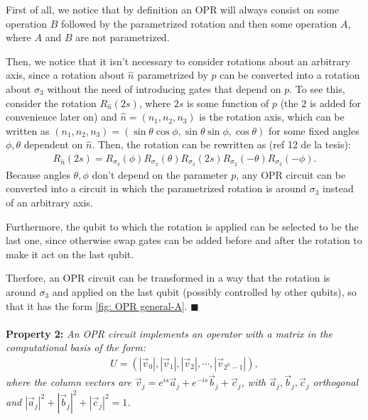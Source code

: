 First of all, we notice that by definition an OPR
will always consist on some operation $B$ followed by the parametrized rotation 
and then some operation $A$, where $A$ and $B$ are not parametrized. 

Then, we notice that it isn't necessary to consider rotations
about an arbitrary axis, since a rotation about $\hat{n}$ parametrized by $p$ can
be converted into a rotation about $\sigma_3$ without the need of introducing gates that depend on $p$.
To see this, consider the rotation $R_{\hat{n}}(2s)$, where $2s$ is some function of $p$ (the $2$ is added for convenience later on) and $\hat{n} = (n_1,n_2,n_3)$ is the rotation axis,
 which can be written as $(n_1,n_2,n_3) = (\sin \theta \cos \phi , \sin \theta\sin \phi, \cos \theta)$ for some fixed angles $\phi, \theta$ dependent on $\hat{n}$. 
 Then, the rotation can be rewritten as (ref 12 de la tesis):
\begin{eqnarray}
R_{\hat{n}}(2s) = R_{\sigma_3}(\phi) R_{\sigma_2}(\theta) R_{\sigma_3}(2s) R_{\sigma_2}(-\theta) R_{\sigma_3}(-\phi).
\end{eqnarray}
Because angles $\theta, \phi$ don't depend on the parameter $p$, 
any OPR circuit can be converted into a circuit in which the parametrized rotation is around $\sigma_3$ instead of an arbitrary axis.

Furthermore, the qubit to which the rotation is applied can be selected to be the last one,
since otherwise  swap gates can be added before and after the rotation to make it act on the last qubit.

Therfore, an OPR circuit can be transformed in a way that the rotation is around $\sigma_3$ and applied on the last qubit 
(possibly controlled by other qubits), 
so that it has the form \ref{fig: OPR general-A}. $\blacksquare$ \\ \\

\textbf{Property 2:} \textit{An OPR circuit implements an operator with a matrix in the computational basis of the form:}
\begin{eqnarray}
U = (|\vec{v}_0|, |\vec{v}_1|, |\vec{v}_2|, \cdots, |\vec{v}_{2^n-1}|),
\end{eqnarray}
\textit{where the column vectors are $\vec{v}_j = e^{is} \vec{a}_j + e^{-is} \vec{b}_j + \vec{c}_j$,
with $\vec{a}_j ,\vec{b}_j, \vec{c}_j$ orthogonal and $|\vec{a}_j|^2 + |\vec{b}_j|^2 + |\vec{c}_j|^2 = 1$.}\\

